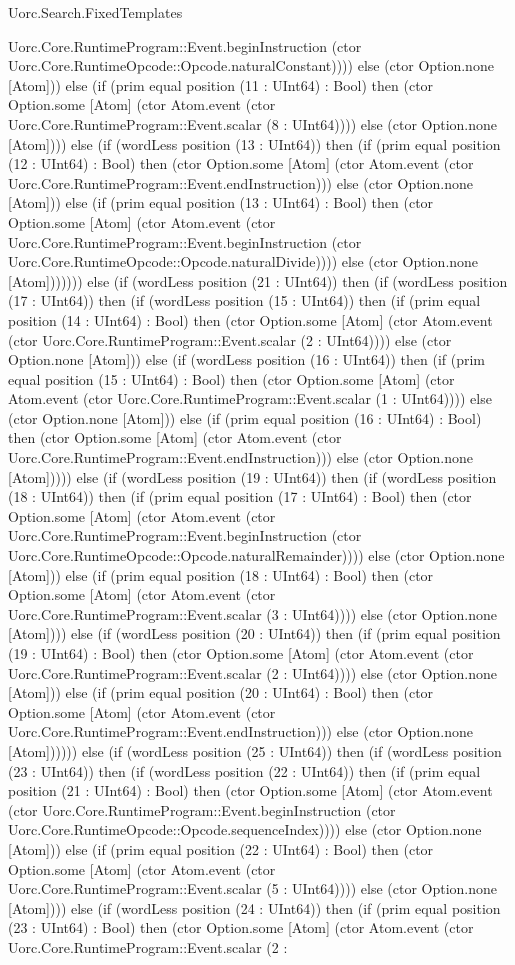 \begin{lexlean}{Uorc.Search.FixedTemplates}
\begin{semanticmodule}
{Uorc.Core.RuntimeProgram::Event.beginInstruction (ctor Uorc.Core.RuntimeOpcode::Opcode.naturalConstant)))) else (ctor Option.none [Atom])) else (if (prim equal position (11 : UInt64) : Bool) then (ctor Option.some [Atom] (ctor Atom.event (ctor Uorc.Core.RuntimeProgram::Event.scalar (8 : UInt64)))) else (ctor Option.none [Atom]))) else (if (wordLess position (13 : UInt64)) then (if (prim equal position (12 : UInt64) : Bool) then (ctor Option.some [Atom] (ctor Atom.event (ctor Uorc.Core.RuntimeProgram::Event.endInstruction))) else (ctor Option.none [Atom])) else (if (prim equal position (13 : UInt64) : Bool) then (ctor Option.some [Atom] (ctor Atom.event (ctor Uorc.Core.RuntimeProgram::Event.beginInstruction (ctor Uorc.Core.RuntimeOpcode::Opcode.naturalDivide)))) else (ctor Option.none [Atom])))))) else (if (wordLess position (21 : UInt64)) then (if (wordLess position (17 : UInt64)) then (if (wordLess position (15 : UInt64)) then (if (prim equal position (14 : UInt64) : Bool) then (ctor Option.some [Atom] (ctor Atom.event (ctor Uorc.Core.RuntimeProgram::Event.scalar (2 : UInt64)))) else (ctor Option.none [Atom])) else (if (wordLess position (16 : UInt64)) then (if (prim equal position (15 : UInt64) : Bool) then (ctor Option.some [Atom] (ctor Atom.event (ctor Uorc.Core.RuntimeProgram::Event.scalar (1 : UInt64)))) else (ctor Option.none [Atom])) else (if (prim equal position (16 : UInt64) : Bool) then (ctor Option.some [Atom] (ctor Atom.event (ctor Uorc.Core.RuntimeProgram::Event.endInstruction))) else (ctor Option.none [Atom])))) else (if (wordLess position (19 : UInt64)) then (if (wordLess position (18 : UInt64)) then (if (prim equal position (17 : UInt64) : Bool) then (ctor Option.some [Atom] (ctor Atom.event (ctor Uorc.Core.RuntimeProgram::Event.beginInstruction (ctor Uorc.Core.RuntimeOpcode::Opcode.naturalRemainder)))) else (ctor Option.none [Atom])) else (if (prim equal position (18 : UInt64) : Bool) then (ctor Option.some [Atom] (ctor Atom.event (ctor Uorc.Core.RuntimeProgram::Event.scalar (3 : UInt64)))) else (ctor Option.none [Atom]))) else (if (wordLess position (20 : UInt64)) then (if (prim equal position (19 : UInt64) : Bool) then (ctor Option.some [Atom] (ctor Atom.event (ctor Uorc.Core.RuntimeProgram::Event.scalar (2 : UInt64)))) else (ctor Option.none [Atom])) else (if (prim equal position (20 : UInt64) : Bool) then (ctor Option.some [Atom] (ctor Atom.event (ctor Uorc.Core.RuntimeProgram::Event.endInstruction))) else (ctor Option.none [Atom]))))) else (if (wordLess position (25 : UInt64)) then (if (wordLess position (23 : UInt64)) then (if (wordLess position (22 : UInt64)) then (if (prim equal position (21 : UInt64) : Bool) then (ctor Option.some [Atom] (ctor Atom.event (ctor Uorc.Core.RuntimeProgram::Event.beginInstruction (ctor Uorc.Core.RuntimeOpcode::Opcode.sequenceIndex)))) else (ctor Option.none [Atom])) else (if (prim equal position (22 : UInt64) : Bool) then (ctor Option.some [Atom] (ctor Atom.event (ctor Uorc.Core.RuntimeProgram::Event.scalar (5 : UInt64)))) else (ctor Option.none [Atom]))) else (if (wordLess position (24 : UInt64)) then (if (prim equal position (23 : UInt64) : Bool) then (ctor Option.some [Atom] (ctor Atom.event (ctor Uorc.Core.RuntimeProgram::Event.scalar (2 : }
\end{semanticmodule}
\end{lexlean}
